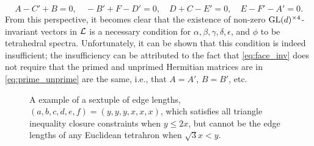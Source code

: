 \documentclass[notitlepage, 10pt]{article}
\begin{document}
\begin{rem}
\begin{equation}
        A - C' + B = 0, \quad
        - B' + F - D' = 0, \quad
        D + C - E' = 0, \quad
        E - F' - A' = 0.
    \end{equation}
    From this perspective, it becomes clear that the existence of non-zero $\operatorname{GL}(d)^{\times 4}$-invariant vectors in $\mathcal L$ is a necessary condition for $\alpha,\beta, \gamma, \delta, \epsilon$, and $\phi$ to be tetrahedral spectra.
    Unfortunately, it can be shown that this condition is indeed insufficient; the insufficiency can be attributed to the fact that \cref{eq:face_inv} does not require that the primed and unprimed Hermitian matrices are in \cref{eq:prime_unprime} are the same, i.e., that $A = A'$, $B = B'$, etc.
\end{rem}
\begin{center}
    \begin{figure}
        \caption{A example of a sextuple of edge lengths, $(a,b,c,d,e,f) = (y,y,y,x,x,x)$, which satisfies all triangle inequality closure constraints when $y \leq 2x$, but cannot be the edge lengths of any Euclidean tetrahron when $\sqrt{3} x < y$.}
    \end{figure}
\end{center}
\end{document}
